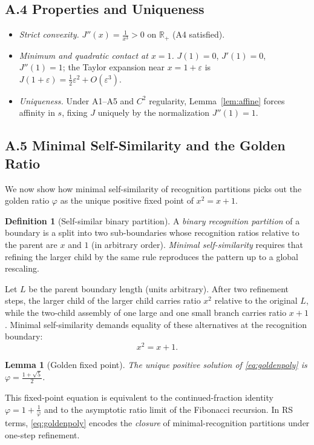 \documentclass[11pt]{article}
\newtheorem{lemma}[theorem]{Lemma}
\theoremstyle{definition}
\newtheorem{definition}[theorem]{Definition}
\theoremstyle{remark}
\begin{document}
\subsection*{A.4 Properties and Uniqueness}
\begin{itemize}
\item \textit{Strict convexity.} $J''(x)=\tfrac{1}{x^3}>0$ on $\mathbb{R}_+$ (A4 satisfied).
\item \textit{Minimum and quadratic contact at $x=1$.} $J(1)=0$, $J'(1)=0$, $J''(1)=1$; the Taylor expansion near $x=1+\varepsilon$ is $J(1+\varepsilon)=\tfrac12\varepsilon^2+O(\varepsilon^3)$.
\item \textit{Uniqueness.} Under A1–A5 and $C^2$ regularity, Lemma~\ref{lem:affine} forces affinity in $s$, fixing $J$ uniquely by the normalization $J''(1)=1$.
\end{itemize}

\subsection*{A.5 Minimal Self-Similarity and the Golden Ratio}
We now show how minimal self-similarity of recognition partitions picks out the golden ratio $\varphi$ as the unique positive fixed point of $x^2=x+1$.

\begin{definition}[Self-similar binary partition]
A \emph{binary recognition partition} of a boundary is a split into two sub-boundaries whose recognition ratios relative to the parent are $x$ and $1$ (in arbitrary order). \emph{Minimal self-similarity} requires that refining the larger child by the same rule reproduces the pattern up to a global rescaling.
\end{definition}

Let $L$ be the parent boundary length (units arbitrary). After two refinement steps, the larger child of the larger child carries ratio $x^2$ relative to the original $L$, while the two-child assembly of one large and one small branch carries ratio $x+1$. Minimal self-similarity demands equality of these alternatives at the recognition boundary:
\begin{equation}
x^2=x+1.
\label{eq:goldenpoly}
\end{equation}
\begin{lemma}[Golden fixed point]
The unique positive solution of \eqref{eq:goldenpoly} is $\displaystyle \varphi=\frac{1+\sqrt{5}}{2}$.
\end{lemma}

\noindent This fixed-point equation is equivalent to the continued-fraction identity $\varphi=1+\frac{1}{\varphi}$ and to the asymptotic ratio limit of the Fibonacci recursion. In RS terms, \eqref{eq:goldenpoly} encodes the \emph{closure} of minimal-recognition partitions under one-step refinement.
\end{document}
